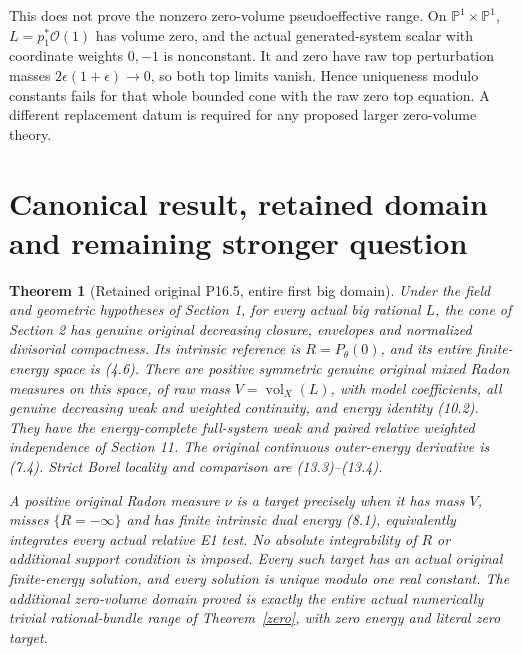 \documentclass[10pt]{article}
\newtheorem{theorem}{Theorem}[section]
\newcommand{\vol}{\operatorname{vol}}
\newcommand{\OO}{\mathcal O}
\begin{document}
This does not prove the nonzero zero-volume pseudoeffective range.
On $\mathbb P^1\times\mathbb P^1$, $L=p_1^*\OO(1)$ has volume zero,
and the actual generated-system scalar with coordinate weights $0,-1$
is nonconstant. It and zero have raw top perturbation masses
$2\epsilon(1+\epsilon)\to0$, so both top limits vanish. Hence uniqueness
modulo constants fails for that whole bounded cone with the raw zero
top equation. A different replacement datum is required for any proposed
larger zero-volume theory.

\section{Canonical result, retained domain and remaining stronger question}
\begin{theorem}[Retained original P16.5, entire first big domain]
Under the field and geometric hypotheses of Section 1, for every actual
big rational $L$, the cone of Section 2 has genuine original decreasing
closure, envelopes and normalized divisorial compactness. Its intrinsic
reference is $R=P_\theta(0)$, and its entire finite-energy space is (4.6).
There are positive symmetric genuine original mixed Radon measures on this
space, of raw mass $V=\vol_X(L)$, with model coefficients, all genuine
decreasing weak and weighted continuity, and energy identity (10.2).
They have the energy-complete full-system weak and paired relative weighted
independence of Section 11. The original continuous outer-energy derivative
is (7.4). Strict Borel locality and comparison are (13.3)--(13.4).

A positive original Radon measure $\nu$ is a target precisely when it has
mass $V$, misses $\{R=-\infty\}$ and has finite intrinsic dual energy
(8.1), equivalently integrates every actual relative E1 test. No absolute
integrability of $R$ or additional support condition is imposed. Every such
target has an actual original finite-energy solution, and every solution
is unique modulo one real constant. The additional zero-volume domain
proved is exactly the entire actual numerically trivial rational-bundle
range of Theorem~\ref{zero}, with zero energy and literal zero target.
\end{theorem}
\end{document}
